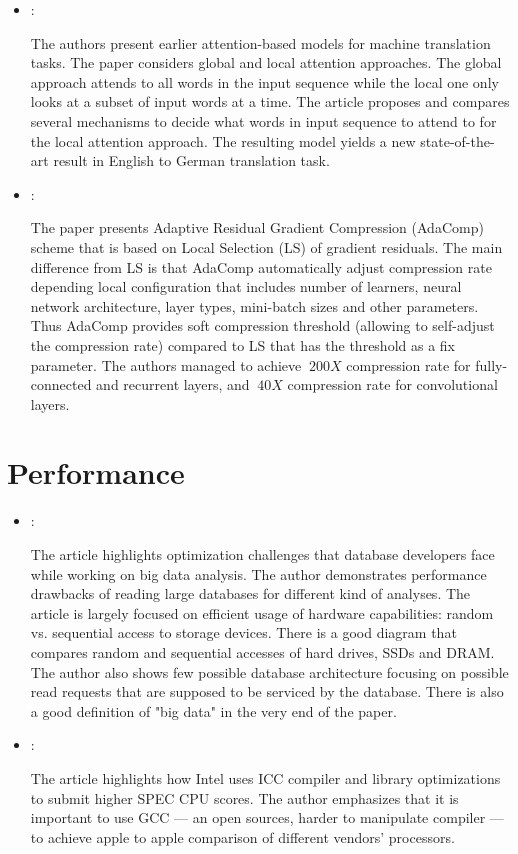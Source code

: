\begin{itemize}
    \item \cite{Luong:AttentionNMT:2015}:

    The authors present earlier attention-based models for machine translation tasks. The paper considers global and local attention approaches. The global approach attends to all words in the input sequence while the local one only looks at a subset of input words at a time. The article proposes and compares several mechanisms to decide what words in input sequence to attend to for the local attention approach. The resulting model yields a new state-of-the-art result in English to German translation task.

    \item \cite{Chen:AdaComp:2018}:

    The paper presents Adaptive Residual Gradient Compression (AdaComp) scheme that is based on Local Selection (LS) of gradient residuals. The main difference from LS is that AdaComp automatically adjust compression rate depending local configuration that includes number of learners, neural network architecture, layer types, mini-batch sizes and other parameters. Thus AdaComp provides soft compression threshold (allowing to self-adjust the compression rate) compared to LS that has the threshold as a fix parameter. The authors managed to achieve $~200X$ compression rate for fully-connected and recurrent layers, and $~40X$ compression rate for convolutional layers.
\end{itemize}

\section*{Performance}
\begin{itemize}
    \item \cite{Jacobs:DataBasePerformance:2009}:

    The article highlights optimization challenges that database developers face while working on big data analysis. The author demonstrates performance drawbacks of reading large databases for different kind of analyses. The article is largely focused on efficient usage of hardware capabilities: random vs. sequential access to storage devices. There is a good diagram that compares random and sequential accesses of hard drives, SSDs and DRAM. The author also shows few possible database architecture focusing on possible read requests that are supposed to be serviced by the database. There is also a good definition of "big data" in the very end of the paper.

    \item \cite{Gwennap:IntelHidesBehindICC:2017}:

    The article highlights how Intel uses ICC compiler and library optimizations to submit higher SPEC CPU scores. The author emphasizes that it is important to use GCC --- an open sources, harder to manipulate compiler --- to achieve apple to apple comparison of different vendors' processors.
\end{itemize}


